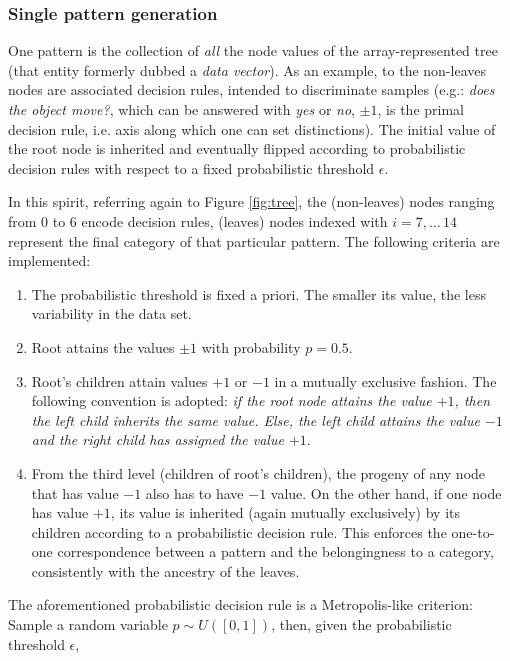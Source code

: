 \documentclass[a4paper,12pt]{article}
\begin{document}
\subsubsection{Single pattern generation}
\label{subsec:singlePatternGen}

One pattern is the collection of \textit{all} the node values of the array-represented tree (that entity formerly dubbed a \textit{data vector}).
As an example, to the non-leaves nodes are associated decision rules, intended to discriminate samples (e.g.: \textit{does the object move?}, which can be answered with \textit{yes} or \textit{no}, $\pm 1$, is the primal decision rule, i.e. axis along which one can set distinctions). The initial value of the root node is inherited and eventually flipped according to probabilistic decision rules with respect to a fixed probabilistic threshold $\epsilon$.

In this spirit, referring again to Figure \ref{fig:tree}, the (non-leaves) nodes ranging from 0 to 6 encode decision rules, (leaves) nodes indexed with $i = 7,\dots\,14$ represent the final category of that particular pattern. The following criteria are implemented:

\begin{enumerate}[(1)]
	\item The probabilistic threshold is fixed a priori. The smaller its value, the less variability in the data set.
	\item Root attains the values $\pm 1$ with probability $p = 0.5$.
	\item Root's children attain values $+1$ or $-1$ in a mutually exclusive fashion. The following convention is adopted: \textit{if the root node attains the value $+1$, then the left child inherits the same value. Else, the left child attains the value $-1$ and the right child has assigned the value $+1$}. 
	\item From the third level (children of root's children), the progeny of any node that has value $-1$ also has to have $-1$ value. On the other hand, if one node has value $+1$, its value is inherited (again mutually exclusively) by its children according to a probabilistic decision rule. This enforces the one-to-one correspondence between a pattern and the belongingness to a category, consistently with the ancestry of the leaves. 
\end{enumerate}

The aforementioned probabilistic decision rule is a Metropolis-like criterion: Sample a random variable $p \sim U([0,1])$, then, given the probabilistic threshold $\epsilon$,
\end{document}
